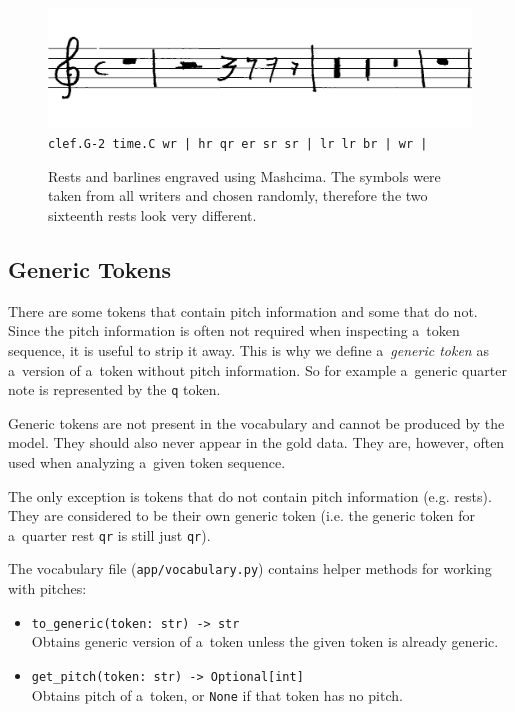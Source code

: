 \begin{figure}[h]
    \centering
    \includegraphics[width=140mm]{../img/rests-and-barlines}
    \verb`clef.G-2 time.C wr | hr qr er sr sr | lr lr br | wr |`
    \caption{Rests and barlines engraved using Mashcima. The symbols were taken from all writers and chosen randomly, therefore the two sixteenth rests look very different.}
    \label{fig4:RestsAndBarlines}
\end{figure}


\subsection{Generic Tokens}

There are some tokens that contain pitch information and some that do not. Since the pitch information is often not required when inspecting a~token sequence, it is useful to strip it away. This is why we define a~\emph{generic token} as a~version of a~token without pitch information. So for example a~generic quarter note is represented by the \texttt{q} token.

Generic tokens are not present in the vocabulary and cannot be produced by the model. They should also never appear in the gold data. They are, however, often used when analyzing a~given token sequence.

The only exception is tokens that do not contain pitch information (e.g. rests). They are considered to be their own generic token (i.e. the generic token for a~quarter rest \texttt{qr} is still just \texttt{qr}).

The vocabulary file (\texttt{app/vocabulary.py}) contains helper methods for working with pitches:

\begin{itemize}
\item \verb"to_generic(token: str) -> str"\\
Obtains generic version of a~token unless the given token is already generic.
\item \verb"get_pitch(token: str) -> Optional[int]"\\
Obtains pitch of a~token, or \texttt{None} if that token has no pitch.
\end{itemize}


